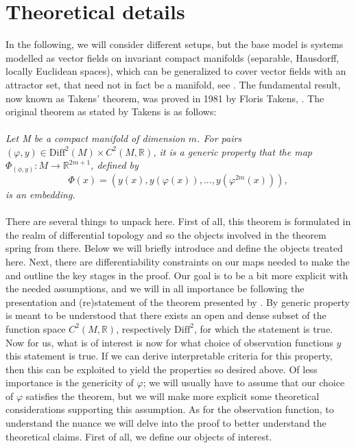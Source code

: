 \documentclass[11pt, a4paper]{memoir}
\newcommand{\mR}{\mathbb{R}}
\begin{document}
\section{Theoretical details}
In the following, we will consider different setups, but the base model is systems modelled as vector fields on invariant compact manifolds (separable, Hausdorff, locally Euclidean spaces), which can be generalized to cover vector fields with an attractor set, that need not in fact be a manifold, see \cite{Sauer1991}. The fundamental result, now known as Takens' theorem, was proved in 1981 by Floris Takens, \cite{Takens}. The original theorem as stated by Takens is as follows:\\\\
\textit{Let M be a compact manifold of dimension $m$. For pairs $(\varphi,y)\in \text{Diff}^2(M)\times C^2(M,\mathbb{R})$, it is a generic property that the map $\Phi_{(\phi,y)}:M\to \mathbb{R}^{2m+1}$, defined by
$$\Phi(x)=(y(x),y(\varphi(x)),...,y(\varphi^{2m}(x))),$$
is an embedding. \cite{Takens}}\\\\
There are several things to unpack here. First of all, this theorem is formulated in the realm of differential topology and so the objects involved in the theorem spring from there. Below we will briefly introduce and define the objects treated here. Next, there are differentiability constraints on our maps needed to make the and outline the key stages in the proof. Our goal is to be a bit more explicit with the needed assumptions, and we will in all importance be following the presentation and (re)statement of the theorem presented by \cite{Huke}. By generic property is meant to be understood that there exists an open and dense subset of the function space $C^2(M,\mR)$, respectively $\text{Diff}^2$, for which the statement is true. Now for us, what is of interest is now for what choice of observation functions $y$ this statement is true. If we can derive interpretable criteria for this property, then this can be exploited to yield the properties so desired above. Of less importance is the genericity of $\varphi$; we will usually have to assume that our choice of $\varphi$ satisfies the theorem, but we will make more explicit some theoretical considerations supporting this assumption. As for the observation function, to understand the nuance we will delve into the proof to better understand the theoretical claims. First of all, we define our objects of interest.\\\\
\end{document}
